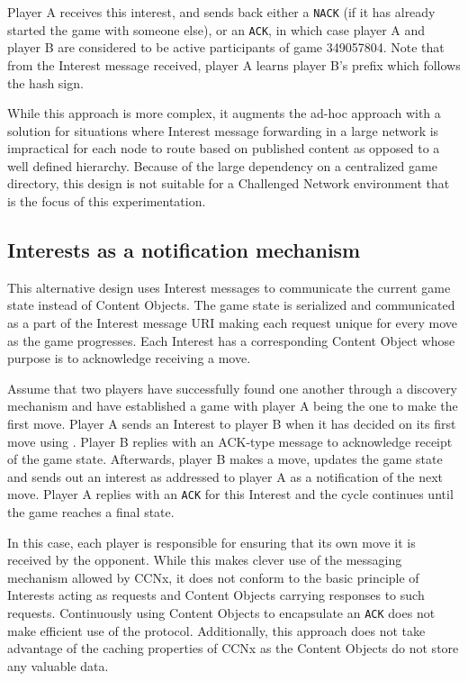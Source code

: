 \documentclass[a4paper,12pt]{report}      %
\begin{document}
\texttt{}

Player A receives this interest, and sends back either a \verb!NACK! (if it has already started the game with
someone else), or an \verb!ACK!, in which case player A and player B are considered to be active participants
of game 349057804. Note that from the Interest message received, player A learns player B's prefix
which follows the hash sign.

While this approach is more complex, it augments the ad-hoc approach with a solution for situations
where Interest message forwarding in a large network is impractical for each node to route based on
published content as opposed to a well defined hierarchy. Because of the large dependency on a centralized game directory, 
this design is not suitable for a Challenged Network environment that is the focus of this experimentation. 

\subsection{Interests as a notification mechanism}

This alternative design uses Interest messages to communicate the current game state instead of Content Objects. The game state is serialized and communicated as a part of the Interest message URI making each request unique for every move as the game progresses. Each Interest has a corresponding Content Object whose purpose is to acknowledge receiving a move. 

Assume that two players have successfully found one another through a discovery mechanism and
have established a game with player A being the one to make the first move. Player A sends an Interest
to player B when it has decided on its first move using \texttt{}.
Player B replies with an ACK-type message to acknowledge receipt of the game state. Afterwards,
player B makes a move, updates the game state and sends out an interest as
\texttt{} addressed to player A as a notification of the next move.
Player A replies with an \verb!ACK! for this Interest and the cycle continues until the game reaches a final
state.

In this case, each player is responsible for ensuring that its own move it is received by the opponent. While this makes clever use of the messaging mechanism allowed by CCNx, it does not conform to the basic principle of Interests acting as requests and 
Content Objects carrying responses to such requests. Continuously using Content Objects to encapsulate an \verb!ACK! 
does not make efficient use of the protocol. Additionally, this approach does not take advantage of the caching properties of CCNx as the Content Objects do not store any valuable data.
\end{document}
